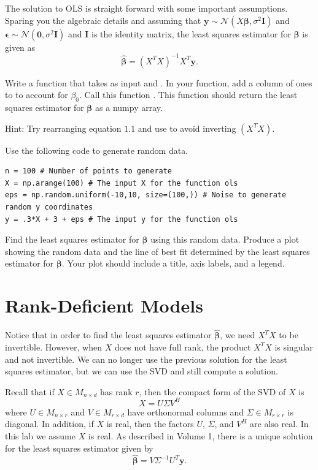The solution to OLS is straight forward with some important assumptions. Sparing you the algebraic details and assuming that 
$\boldsymbol y \sim \mathcal{N}(X\boldsymbol\beta, \sigma^2 \boldsymbol I)$ and $\boldsymbol\epsilon \sim \mathcal{N}(\boldsymbol 0, \sigma^2 \boldsymbol I)$ and $\boldsymbol I$ is the identity matrix, 
the least squares estimator for $\boldsymbol\beta$ is given as 
\begin{equation}
\widehat{\boldsymbol\beta} = (X^TX)^{-1} X^T \boldsymbol y .
\end{equation}

\begin{problem}
Write a function that takes as input  and . In your function, add a column of ones to  to account for $\beta_0$. Call this function . This function should return the least squares estimator for $\boldsymbol\beta$ as a numpy array.

Hint: Try rearranging equation $1.1$ and use  to avoid inverting $(X^T X)$.
\end{problem}

\begin{problem}
Use the following code to generate random data.
\begin{lstlisting}
n = 100 # Number of points to generate
X = np.arange(100) # The input X for the function ols
eps = np.random.uniform(-10,10, size=(100,)) # Noise to generate random y coordinates
y = .3*X + 3 + eps # The input y for the function ols
\end{lstlisting} 
Find the least squares estimator for $\boldsymbol\beta$ using this random data. 
Produce a plot showing the random data and the line of best fit determined by the least squares estimator for $\boldsymbol\beta$. 
Your plot should include a title, axis labels, and a legend. 
\end{problem}

\section*{Rank-Deficient Models}
Notice that in order to find the least squares estimator $\widehat{\boldsymbol\beta}$, we need $X^TX$ to be invertible. 
However, when $X$ does not have full rank, the product $X^TX$ is singular and not invertible. 
We can no longer use the previous solution for the least squares estimator, but we can use the SVD and still compute a solution. 

Recall that if $X \in M_{n\times d}$ has rank $r$, then the compact form of the SVD of $X$ is \[ X = U\Sigma V^H \]
where $U \in M_{n\times r}$ and $V \in M_{r\times d}$ have orthonormal columns and $\Sigma \in M_{r\times r}$ is diagonal. 
In addition, if $X$ is real, then the factors $U$, $\Sigma$, and $V^H$ are also real. In this lab we assume $X$ is real. 
As described in Volume 1, there is a unique solution for the least squares estimator given by 
\begin{equation}
\widehat{\boldsymbol\beta} = V \Sigma^{-1}U^T\boldsymbol y. 
\end{equation}

